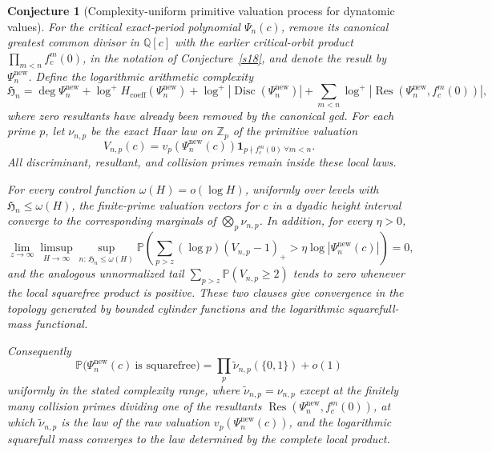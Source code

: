 \documentclass[11pt]{article}
\newtheorem{conjecture}{Conjecture}
\theoremstyle{definition}
\newcommand{\Pp}{\mathbb P}
\newcommand{\Z}{\mathbb Z}
\newcommand{\Q}{\mathbb Q}
\providecommand{\Z}{\mathbb Z}
\providecommand{\Q}{\mathbb Q}
\providecommand{\Pp}{\mathbb P}
\begin{document}
\begin{conjecture}[Complexity-uniform primitive valuation process for dynatomic values]\label{s19}
For the critical exact-period polynomial $\Psi_n(c)$, remove its canonical greatest
common divisor in $\Q[c]$ with the earlier critical-orbit product $\prod_{m<n}f_c^m(0)$, in the notation of Conjecture~\ref{s18}, and denote the result
by $\Psi_n^{\mathrm{new}}$.  Define the logarithmic arithmetic complexity
\[
 \mathfrak H_n=
 \deg\Psi_n^{\mathrm{new}}
 +\log^+H_{\mathrm{coeff}}(\Psi_n^{\mathrm{new}})
 +\log^+|\operatorname{Disc}(\Psi_n^{\mathrm{new}})|
 +\sum_{m<n}\log^+|\operatorname{Res}(\Psi_n^{\mathrm{new}},f_c^m(0))|,
\]
where zero resultants have already been removed by the canonical gcd.  For each prime
$p$, let $\nu_{n,p}$ be the exact Haar law on $\Z_p$ of the primitive valuation
\[
 V_{n,p}(c)=v_p(\Psi_n^{\mathrm{new}}(c))
 \mathbf 1_{p\nmid f_c^m(0)\ \forall m<n}.
\]
All discriminant, resultant, and collision primes remain inside these local laws.

For every control function $\omega(H)=o(\log H)$, uniformly over levels with
$\mathfrak H_n\le\omega(H)$, the finite-prime valuation vectors for $c$ in a dyadic
height interval converge to the corresponding marginals of
$\bigotimes_p\nu_{n,p}$.  In addition, for every $\eta>0$,
\[
 \lim_{z\to\infty}\limsup_{H\to\infty}
 \sup_{n:\,\mathfrak H_n\le\omega(H)}
 \Pp\!\left(
   \sum_{p>z}(\log p)(V_{n,p}-1)_+>
   \eta\log|\Psi_n^{\mathrm{new}}(c)|
 \right)=0,
\]
and the analogous unnormalized tail
$\sum_{p>z}\Pp(V_{n,p}\ge2)$ tends to zero whenever the local squarefree product is
positive.  These two clauses give convergence in the topology generated by bounded
cylinder functions and the logarithmic squarefull-mass functional.

Consequently
\[
 \Pp\bigl(\Psi_n^{\mathrm{new}}(c)\ \text{is squarefree}\bigr)
 =\prod_p\tilde\nu_{n,p}(\{0,1\})+o(1)
\]
uniformly in the stated complexity range, where $\tilde\nu_{n,p}=\nu_{n,p}$ except at the finitely many collision primes dividing one of the resultants $\operatorname{Res}(\Psi_n^{\mathrm{new}},f_c^m(0))$, at which $\tilde\nu_{n,p}$ is the law of the raw valuation $v_p(\Psi_n^{\mathrm{new}}(c))$, and the logarithmic squarefull mass converges
to the law determined by the complete local product.
\end{conjecture}
\end{document}
